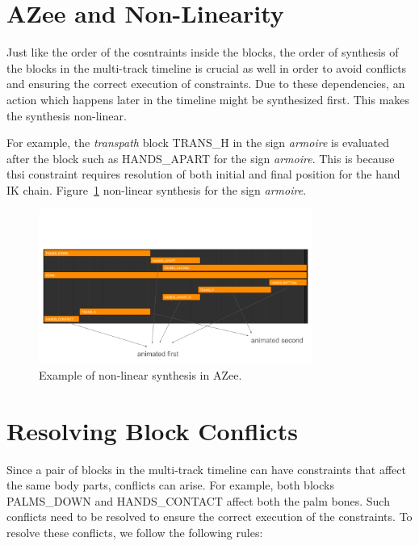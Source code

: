 \documentclass[../../main.tex]{subfiles}
\begin{document}
\section{AZee and Non-Linearity}
\label{ch:multi_track:azee_nl}

Just like the order of the cosntraints inside the blocks, the order of synthesis of the blocks in the multi-track timeline is crucial as well in order to avoid conflicts and ensuring the correct execution of constraints. Due to these dependencies, an action which happens later in the timeline might be synthesized first. This makes the synthesis non-linear. 

For example, the \emph{transpath} block TRANS\_H in the sign \emph{armoire} is evaluated after the block such as HANDS\_APART for the sign \emph{armoire}. This is because thsi constraint requires resolution of both initial and final position for the hand IK chain. Figure~\ref{fig:example_azee_non_linear} non-linear synthesis for the sign \emph{armoire}.

\begin{figure}[h]
    \centering
    \includegraphics[width=0.8\textwidth]{chapters/multi_track/images/example_azee_non_linear.png}
    \caption{Example of non-linear synthesis in AZee.}
    \label{fig:example_azee_non_linear}
\end{figure}

\section{Resolving Block Conflicts}
\label{ch:multi_track:resolve_conflitcs}

Since a pair of blocks in the multi-track timeline can have constraints that affect the same body parts, conflicts can arise. For example, both blocks PALMS\_DOWN and HANDS\_CONTACT affect both the palm bones. Such conflicts need to be resolved to ensure the correct execution of the constraints. To resolve these conflicts, we follow the following rules:
\end{document}
